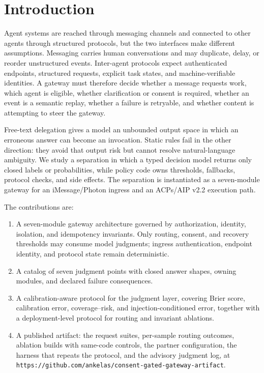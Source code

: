 \documentclass[runningheads,a4paper]{llncs}
\begin{document}
\section{Introduction}

Agent systems are reached through messaging channels and connected to other agents through structured protocols, but the two interfaces make different assumptions. Messaging carries human conversations and may duplicate, delay, or reorder unstructured events. Inter-agent protocols expect authenticated endpoints, structured requests, explicit task states, and machine-verifiable identities. A gateway must therefore decide whether a message requests work, which agent is eligible, whether clarification or consent is required, whether an event is a semantic replay, whether a failure is retryable, and whether content is attempting to steer the gateway.

Free-text delegation gives a model an unbounded output space in which an erroneous answer can become an invocation. Static rules fail in the other direction: they avoid that output risk but cannot resolve natural-language ambiguity. We study a separation in which a typed decision model returns only closed labels or probabilities, while policy code owns thresholds, fallbacks, protocol checks, and side effects. The separation is instantiated as a seven-module gateway for an iMessage/Photon ingress and an ACPs/AIP v2.2 execution path.

The contributions are:

\begin{enumerate}

\item A seven-module gateway architecture governed by authorization, identity, isolation, and idempotency invariants. Only routing, consent, and recovery thresholds may consume model judgments; ingress authentication, endpoint identity, and protocol state remain deterministic.

\item A catalog of seven judgment points with closed answer shapes, owning modules, and declared failure consequences.

\item A calibration-aware protocol for the judgment layer, covering Brier score, calibration error, coverage--risk, and injection-conditioned error, together with a deployment-level protocol for routing and invariant ablations.

\item A published artifact: the request suites, per-sample routing outcomes, ablation builds with same-code controls, the partner configuration, the harness that repeats the protocol, and the advisory judgment log, at \texttt{https:/\allowbreak{}/\allowbreak{}github.com/\allowbreak{}ankelas/\allowbreak{}consent-\allowbreak{}gated-ga\allowbreak{}teway-ar\allowbreak{}tifact}.

\end{enumerate}
\end{document}
